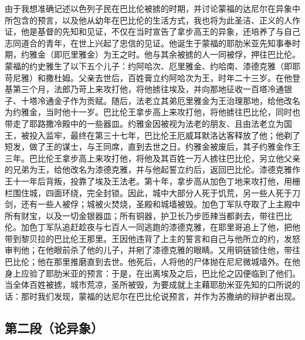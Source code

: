 由于我想准确记述以色列子民在巴比伦被掳的时期，并讨论蒙福的达尼尔在异象中所包含的预言，以及他从幼年在巴比伦的生活方式，我也将为此圣洁、正义的人作证，他是基督的先知和见证，不仅在当时宣告了拿步高王的异象，还培养了与自己志同道合的青年，在世上兴起了忠信的见证。他诞生于蒙福的耶肋米亚先知事奉时期，约雅金（即厄里雅金）为王之时。他与其余被掳的人一同被俘，押往巴比伦。蒙福的约史雅生了以下五个儿子：约阿哈次、厄里雅金、约哈南、漆德克雅（即耶苛尼雅）和撒杜姆。父亲去世后，百姓膏立约阿哈次为王，时年二十三岁。在他登基第三个月，法郎乃苛上来攻打他，将他掳往埃及，并向那地征收一百塔冷通银子、十塔冷通金子作为贡赋。随后，法老立其弟厄里雅金为王治理那地，给他改名为约雅金，当时他十一岁。巴比伦王拿步高上来攻打他，将他掳往巴比伦，同时也带走了耶路撒冷殿中的一些器皿。约雅金因被视为法老的朋友、且由法老立为国王，被投入监牢，最终在第三十七年，巴比伦王厄威耳默洛达客释放了他；他剃了短发，做了王的谋士，与王同席，直到去世之日。约雅金被废后，其子约雅金作王三年。巴比伦王拿步高上来攻打他，将他及其百姓一万人掳往巴比伦，另立他父亲的兄弟为王，给他改名为漆德克雅，并与他起誓立约后，返回巴比伦。漆德克雅作王十一年后背叛，投靠了埃及王法老。第十年，拿步高从加色丁地来攻打他，用栅栏围住城，四面环绕，完全封锁。因此，城中大部分人死于饥荒，另一些人死于刀剑，还有一些人被俘；城被火焚烧，圣殿和城墙被毁。加色丁军队夺取了上主殿中所有财宝，以及一切金银器皿；所有铜器，护卫长乃步匝辣当都剥去，带往巴比伦。加色丁军队追赶趁夜与七百人一同逃跑的漆德克雅，在耶里哥追上了他，把他带到黎贝拉的巴比伦王那里。王因他违背了上主的誓言和自己与他所立的约，发怒审判他；在他眼前杀了他的儿子，并剜了漆德克雅的眼睛。又用铜链锁住他，带往巴比伦；他在那里推磨直到去世。他死后，人将他的尸体抛在尼尼微城墙外。在他身上应验了耶肋米亚的预言：于是，在出离埃及之后，巴比伦之囚便临到了他们。当全体百姓被掳，城市荒凉，圣所被毁，为要成就上主藉耶肋米亚先知的口所说的话：那时我们发现，蒙福的达尼尔在巴比伦说预言，并作为苏撒纳的辩护者出现。\par


\subsection{第二段（论异象）}

